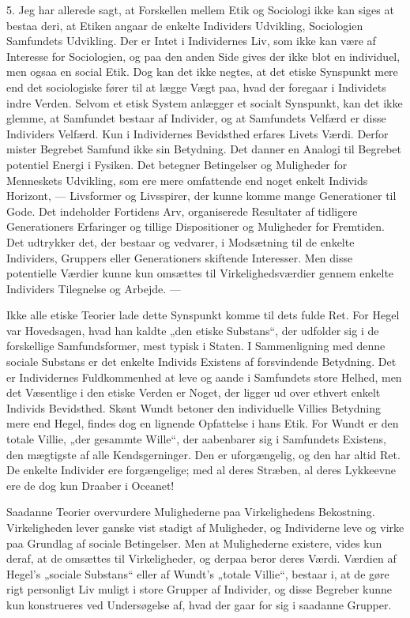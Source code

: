 \documentclass[12pt,a4paper,openany]{book}
\newcommand{\opage}[1]{\marginnote{\footnotesize\textit{[#1]}}}
\begin{document}
5. Jeg har allerede sagt, at Forskellen mellem Etik og
Sociologi ikke kan siges at bestaa deri, at Etiken angaar de
enkelte Individers Udvikling, Sociologien Samfundets Udvikling.
Der er Intet i Individernes Liv, som ikke kan være af Interesse
for Sociologien, og paa den anden Side gives der ikke
blot en individuel, men ogsaa en social Etik. Dog kan det
ikke negtes, at det etiske Synspunkt mere end det sociologiske
fører til at lægge Vægt paa, hvad der foregaar i Individets
indre Verden. Selvom et etisk System anlægger et socialt
\setcounter{footnote}{0}%
\opage{75}Synspunkt, kan det ikke glemme, at Samfundet bestaar af Individer,
og at Samfundets Velfærd er disse Individers Velfærd.
Kun i Individernes Bevidsthed erfares Livets Værdi. Derfor
mister Begrebet Samfund ikke sin Betydning. Det danner en
Analogi til Begrebet potentiel Energi i Fysiken. Det betegner
Betingelser og Muligheder for Menneskets Udvikling, som ere
mere omfattende end noget enkelt Individs Horizont, --- Livsformer
og Livsspirer, der kunne komme mange Generationer
til Gode. Det indeholder Fortidens Arv, organiserede Resultater
af tidligere Generationers Erfaringer og tillige Dispositioner
og Muligheder for Fremtiden. Det udtrykker det, der
bestaar og vedvarer, i Modsætning til de enkelte Individers,
Gruppers eller Generationers skiftende Interesser. Men disse
potentielle Værdier kunne kun omsættes til Virkelighedsværdier
gennem enkelte Individers Tilegnelse og Arbejde. ---

Ikke alle etiske Teorier lade dette Synspunkt komme til
dets fulde Ret. For Hegel var Hovedsagen, hvad han kaldte
„den etiske Substans“, der udfolder sig i de forskellige Samfundsformer,
mest typisk i Staten. I Sammenligning med denne
sociale Substans er det enkelte Individs Existens af forsvindende
Betydning. Det er Individernes Fuldkommenhed at leve og
aande i Samfundets store Helhed, men det Væsentlige i den
etiske Verden er Noget, der ligger ud over ethvert enkelt Individs
Bevidsthed. Skønt Wundt betoner den individuelle Villies
Betydning mere end Hegel, findes dog en lignende Opfattelse
i hans Etik. For Wundt er den totale Villie, „der gesammte
Wille“, der aabenbarer sig i Samfundets Existens, den mægtigste
af alle Kendsgerninger. Den er uforgængelig, og den
har altid Ret. De enkelte Individer ere forgængelige; med al
deres Stræben, al deres Lykkeevne ere de dog kun Draaber i
Oceanet!

Saadanne Teorier overvurdere Mulighederne paa Virkelighedens
Bekostning. Virkeligheden lever ganske vist stadigt af
Muligheder, og Individerne leve og virke paa Grundlag af
sociale Betingelser. Men at Mulighederne existere, vides kun
deraf, at de omsættes til Virkeligheder, og derpaa beror deres
Værdi. Værdien af Hegel’s „sociale Substans“ eller af Wundt’s
\setcounter{footnote}{0}%
\opage{76}„totale Villie“, bestaar i, at de gøre rigt personligt Liv muligt
i store Grupper af Individer, og disse Begreber kunne kun
konstrueres ved Undersøgelse af, hvad der gaar for sig i saadanne
Grupper.
\end{document}
